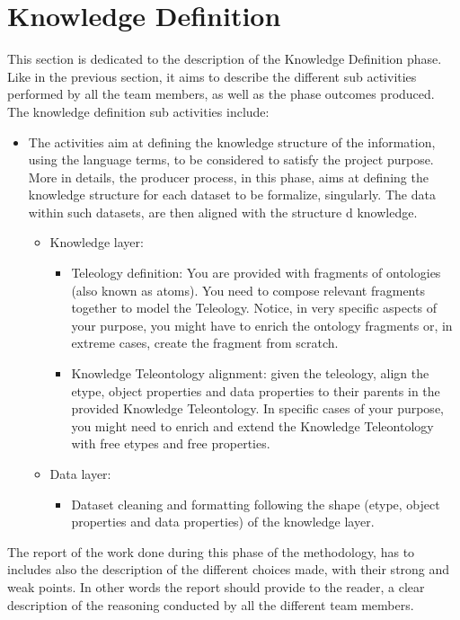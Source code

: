 \section{Knowledge Definition}
This section is dedicated to the description of the Knowledge Definition phase. Like in the previous section, it aims to describe the different sub activities performed by all the team members, as well as the phase outcomes produced. The knowledge definition sub activities include:
\begin{itemize}
    \item The activities aim at defining the knowledge structure of the information, using the language terms, to be considered to satisfy the project purpose. More in details, the producer process, in this phase, aims at defining the knowledge structure for each dataset to be formalize, singularly. The data within such datasets, are then aligned with the structure d knowledge.
    
    \begin{itemize}
        \item Knowledge layer:
        \begin{itemize}
            \item Teleology definition: You are provided with fragments of ontologies (also known as atoms). You need to compose relevant fragments together to model the Teleology. Notice, in very specific aspects of your purpose, you might have to enrich the ontology fragments or, in extreme cases, create the fragment from scratch.
            \item Knowledge Teleontology alignment: given the teleology, align the etype, object properties and data properties to their parents in the provided Knowledge Teleontology. In specific cases of your purpose, you might need to enrich and extend the Knowledge Teleontology with free etypes and free properties.
        \end{itemize}
        \item Data layer:
        \begin{itemize}
            \item Dataset cleaning and formatting following the shape (etype, object properties and data properties) of the knowledge layer.
        \end{itemize}
    \end{itemize}
\end{itemize}

\noindent The report of the work done during this phase of the methodology, has to includes also the description of the  different choices made, with their strong and weak points. In other words the report should provide to the reader, a clear description of the reasoning conducted by all the different team members.

